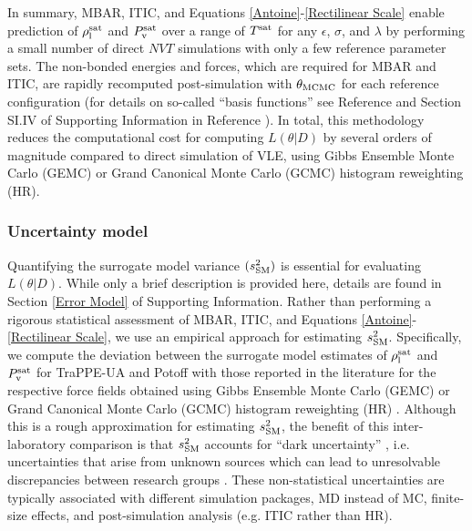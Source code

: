 \documentclass[preprint,letterpaper,floatfix,citeautoscript,aip,jcp]{revtex4-1}
\begin{document}
In summary, MBAR, ITIC, and Equations \ref{Antoine}-\ref{Rectilinear Scale} enable prediction of $\rho_{\rm l}^{\rm sat}$ and $P_{\rm v}^{\rm sat}$ over a range of $T^{\rm sat}$ for any $\epsilon$, $\sigma$, and $\lambda$ by performing a small number of direct $NVT$ simulations with only a few reference parameter sets. The non-bonded energies and forces, which are required for MBAR and ITIC, are rapidly recomputed post-simulation with $\theta_{\rm MCMC}$ for each reference configuration (for details on so-called ``basis functions'' see Reference  and Section SI.IV of Supporting Information in Reference ). 
In total, this methodology reduces the computational cost for computing $L(\theta|D)$ by several orders of magnitude compared to direct simulation of VLE, using Gibbs Ensemble Monte Carlo (GEMC) or Grand Canonical Monte Carlo (GCMC) histogram reweighting (HR).


\subsubsection{Uncertainty model}

Quantifying the surrogate model variance $(s^2_{\rm SM})$ 
is essential for evaluating $L(\theta|D)$. While only a brief description is provided here, details are found in Section \ref{Error Model} of Supporting Information. Rather than performing a rigorous statistical assessment of MBAR, ITIC, and Equations \ref{Antoine}-\ref{Rectilinear Scale}, we use an empirical approach for estimating $s^2_{\rm SM}$. Specifically, we compute the deviation between the surrogate model estimates of $\rho_{\rm l}^{\rm sat}$ and $P_{\rm v}^{\rm sat}$ for TraPPE-UA and Potoff 
with those reported in the literature for the respective force fields obtained using Gibbs Ensemble Monte Carlo (GEMC) or Grand Canonical Monte Carlo (GCMC) histogram reweighting (HR) \cite{TraPPE,Mie}. Although this is a rough approximation for estimating $s^2_{\rm SM}$, the benefit of this inter-laboratory comparison is that $s^2_{\rm SM}$ accounts for ``dark uncertainty'' \cite{Patrone2016}, i.e. uncertainties that arise from unknown sources which can lead to unresolvable discrepancies between research groups \cite{RoundRobin}. These non-statistical uncertainties are typically associated with different simulation packages, MD instead of MC, finite-size effects, and post-simulation analysis (e.g. ITIC rather than HR).
\end{document}
